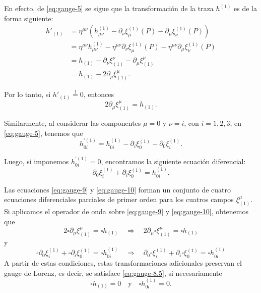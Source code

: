 \documentclass[letterpaper,11pt]{article}
\begin{document}
En efecto, de \eqref{eq:gauge-5} se sigue que la transformación de la traza $h^{(1)}$ es de la forma siguiente:
\begin{align}
h'_{(1)} &= \eta^{\mu\nu} \left(  h_{\mu\nu}^{(1)} - \partial_{\nu} \xi^{(1)}_{\mu}(P) -  \partial_{\mu} \xi_{\nu}^{(1)}(P)\right) \nonumber \\
&= \eta^{\mu\nu} h_{\mu\nu}^{(1)} - \eta^{\mu\nu}  \partial_{\nu} \xi^{(1)}_{\mu}(P) - \eta^{\mu\nu}  \partial_{\mu} \xi_{\nu}^{(1)}(P)  \nonumber \\
&= h_{(1)} - \partial_{\nu} \xi^{\nu}_{(1)} - \partial_{\mu} \xi^{\mu}_{(1)}  \nonumber \\ 
&= h_{(1)} - 2 \partial_{\mu} \xi_{(1)}^{\mu}.
\end{align}

Por lo tanto, si $h'_{(1)} \stackrel{!}{=} 0$, entonces
\begin{equation}
 2 \partial_{\mu} \xi_{(1)}^{\mu} = h_{(1)}. \label{eq:gauge-9} 
\end{equation}

Similarmente, al considerar las componentes $\mu = 0$ y $\nu = i$, con $i = 1,2,3$, en \eqref{eq:gauge-5}, tenemos que
\begin{equation}
h_{0i}^{'(1)} =  h_{0i}^{(1)} - \partial_{i} \xi^{(1)}_{0} -  \partial_{0} \xi_{i}^{(1)}.
\end{equation}

Luego, si imponemos $h_{0i}^{'(1)} = 0$, encontramos la siguiente ecuación diferencial:
\begin{equation}
\partial_0 \xi_i^{(1)} + \partial_{i} \xi_0^{(1)} = h_{0i}^{(1)}. \label{eq:gauge-10} 
\end{equation}

Las ecuaciones \eqref{eq:gauge-9} y \eqref{eq:gauge-10} forman un conjunto de cuatro ecuaciones diferenciales parciales de primer orden para los cuatros campos $\xi_{(1)}^{\mu}$. Si aplicamos el operador de onda sobre \eqref{eq:gauge-9} y \eqref{eq:gauge-10}, obtenemos que 
\begin{equation}
2 \square \partial_{\mu} \xi^{\mu}_{(1)} = \square h_{(1)} \quad \Rightarrow \quad   2 \partial_{\mu} \square \xi^{\mu}_{(1)} = \square h_{(1)} 
\end{equation}
y 
\begin{equation}
\square \partial_0 \xi_i^{(1)} + \square \partial_{i} \xi_0^{(1)} = \square h_{0i}^{(1)} \quad \Rightarrow \quad  \partial_0 \square \xi_i^{(1)} +  \partial_{i} \square \xi_0^{(1)} = \square h_{0i}^{(1)} 
\end{equation}
A partir de estas condiciones, estas transformaciones adicionales preservan el gauge de Lorenz, es decir, se satisface \eqref{eq:gauge-8.5}, si necesariamente
\begin{equation}
\square h_{(1)} = 0 \quad \text{y} \quad \square h_{0i}^{(1)} = 0.
\end{equation}
\end{document}
